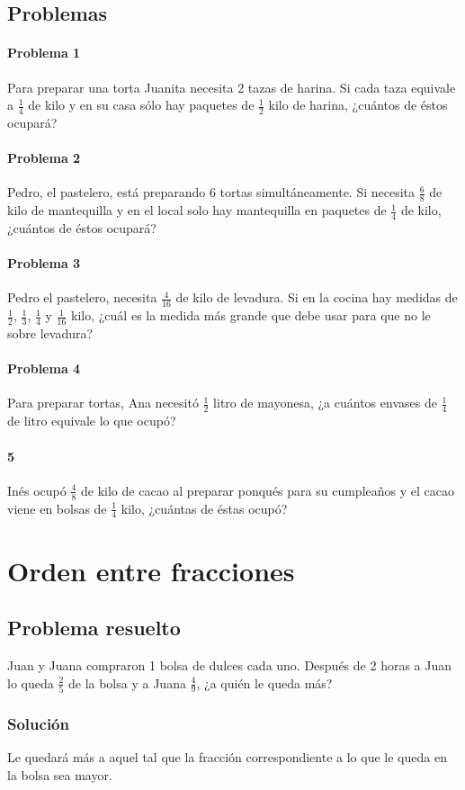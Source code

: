 \documentclass[10pt,twoside]{article}
\begin{document}
\subsection*{Problemas}
\paragraph*{Problema 1}
Para preparar una torta Juanita necesita 2 tazas de harina. Si cada taza equivale a $\frac{1}{4}$ de kilo y en su casa sólo hay paquetes de $\frac{1}{2}$ kilo de harina, ¿cuántos de éstos ocupará?
\paragraph*{Problema 2}
Pedro, el pastelero, está preparando 6 tortas simultáneamente. Si necesita $\frac{6}{8}$ de kilo de mantequilla y en el local solo hay mantequilla en paquetes de $\frac{1}{4}$ de kilo, ¿cuántos de éstos ocupará? 
\paragraph*{Problema 3}
Pedro el pastelero, necesita $\frac{4}{16}$ de kilo de levadura. Si en la cocina hay medidas de $\frac{1}{2}$, $\frac{1}{3}$, $\frac{1}{4}$ y $\frac{1}{16}$ kilo, ¿cuál es la medida más grande que debe usar para que no le sobre levadura?
\paragraph*{Problema 4}
Para preparar tortas, Ana necesitó $\frac{1}{2}$ litro de mayonesa, ¿a cuántos envases de $\frac{1}{4}$ de litro equivale lo que ocup\'{o}?
\paragraph*{5}
Inés ocupó $\frac{4}{8}$ de kilo de cacao al preparar ponqués para su cumpleaños y el cacao viene en bolsas de $\frac{1}{4}$ kilo, ¿cuántas de éstas ocupó?
\section*{Orden entre fracciones}
\subsection*{Problema resuelto}
Juan y Juana compraron 1 bolsa de dulces cada uno. Después de 2 horas a Juan lo queda $\frac{2}{5}$ de la bolsa y a Juana $\frac{4}{9}$, ¿a quién le queda más?
\subsubsection*{Soluci\'{o}n}
Le quedar\'{a} m\'{a}s a aquel tal que la fracci\'{o}n correspondiente a lo que le queda en la bolsa sea mayor.
\end{document}
